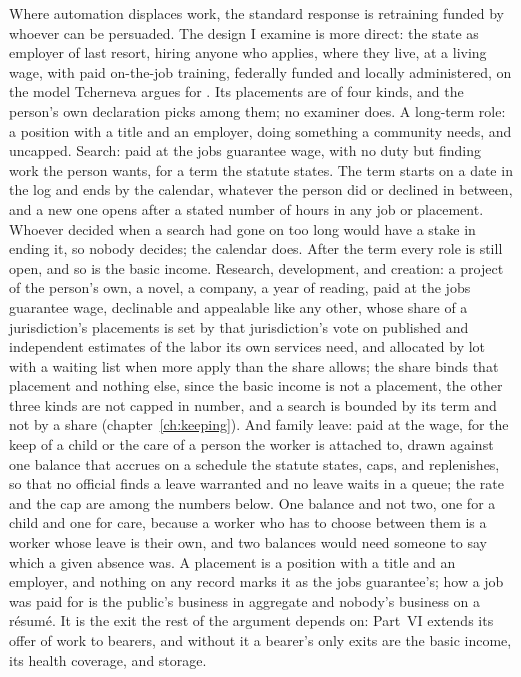 Where automation displaces work, the standard response is retraining funded by whoever can be persuaded. The design I examine is more direct: the state as employer of last resort, hiring anyone who applies, where they live, at a living wage, with paid on-the-job training, federally funded and locally administered, on the model Tcherneva argues for \autocite{tcherneva2020case}. Its placements are of four kinds, and the person's own declaration picks among them; no examiner does. A long-term role: a position with a title and an employer, doing something a community needs, and uncapped. Search: paid at the jobs guarantee wage, with no duty but finding work the person wants, for a term the statute states. The term starts on a date in the log and ends by the calendar, whatever the person did or declined in between, and a new one opens after a stated number of hours in any job or placement. Whoever decided when a search had gone on too long would have a stake in ending it, so nobody decides; the calendar does. After the term every role is still open, and so is the basic income. Research, development, and creation: a project of the person's own, a novel, a company, a year of reading, paid at the jobs guarantee wage, declinable and appealable like any other, whose share of a jurisdiction's placements is set by that jurisdiction's vote on published and independent estimates of the labor its own services need, and allocated by lot with a waiting list when more apply than the share allows; the share binds that placement and nothing else, since the basic income is not a placement, the other three kinds are not capped in number, and a search is bounded by its term and not by a share (chapter~\ref{ch:keeping}). And family leave: paid at the wage, for the keep of a child or the care of a person the worker is attached to, drawn against one balance that accrues on a schedule the statute states, caps, and replenishes, so that no official finds a leave warranted and no leave waits in a queue; the rate and the cap are among the numbers below. One balance and not two, one for a child and one for care, because a worker who has to choose between them is a worker whose leave is their own, and two balances would need someone to say which a given absence was. A placement is a position with a title and an employer, and nothing on any record marks it as the jobs guarantee's; how a job was paid for is the public's business in aggregate and nobody's business on a résumé. It is the exit the rest of the argument depends on: Part~VI extends its offer of work to bearers, and without it a bearer's only exits are the basic income, its health coverage, and storage.

